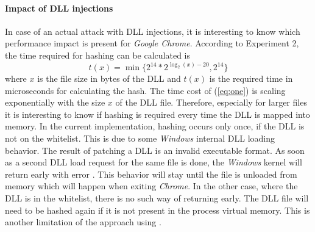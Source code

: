 \paragraph{Impact of \gls{DLL} injections}
In case of an actual attack with DLL injections, it is interesting to know which performance impact is present for \emph{Google Chrome}. According to Experiment 2, the time required for hashing can be calculated is
\begin{equation}
t(x) = \min\{2^{14} * 2^{\log_2(x) - 20}, 2^{14}\} \label{eq:one}
\end{equation}
where $x$ is the file size in bytes of the \gls{DLL} and $t(x)$ is the required time in microseconds for calculating the hash. The time cost of (\ref{eq:one}) is scaling exponentially with the size $x$ of the \gls{DLL} file. Therefore, especially for larger files it is interesting to know if hashing is required every time the \gls{DLL} is mapped into memory. In the current implementation, hashing occurs only once, if the \gls{DLL} is not on the whitelist. This is due to some \emph{Windows} internal \gls{DLL} loading behavior. The result of patching a \gls{DLL} is an invalid executable format. As soon as a second \gls{DLL} load request for the same file is done, the \emph{Windows} kernel will return early with error . This behavior will stay until the file is unloaded from memory which will happen when exiting \emph{Chrome}. In the other case, where the \gls{DLL} is in the whitelist, there is no such way of returning early. The \gls{DLL} file will need to be hashed again if it is not present in the process virtual memory. This is  another limitation of the approach using .